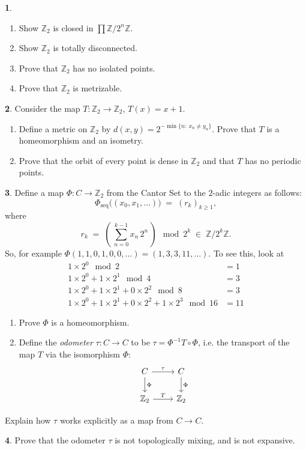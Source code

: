 \documentclass[11pt]{article}
\theoremstyle{definition}
\newtheorem{problem}{}
\newcommand{\bp}{\begin{problem}}
\newcommand{\ep}{\end{problem}\bigskip}
\theoremstyle{theorem}
\newcommand{\Z}{\mathbb{Z}}%
\begin{document}
\bp 
\begin{enumerate}[label=(\alph*)]
\item Show $\Z_2$ is closed in $\prod \Z/2^n\Z$.
\item Show $\Z_2$ is totally disconnected.
\item Prove that $\Z_2$ has no isolated points.
\item Prove that $\Z_2$ is metrizable. 
\end{enumerate}
\ep

\bp Consider the map $T:\Z_2\to\Z_2$, $T(x)=x+1$.
\begin{enumerate}[label=(\alph*)]
\item Define a metric on $\Z_2$ by $d(x,y)=2^{-\min\{n:\ x_n\ne y_n\}}$.  Prove that $T$ is a homeomorphism and an isometry.
\item Prove that the orbit of every point is dense in $\Z_2$ and that $T$ has no periodic points.
\end{enumerate}
\ep


\bp Define a map $\Phi:C\to \Z_2$ from the Cantor Set to the $2$-adic integers as follows: \[\Phi_{\mathrm{seq}}\big((x_0,x_1,\ldots)\big) \;=\; (r_k)_{k\ge1},
\]
where
\[
r_k \;=\; \left(\,\sum_{n=0}^{k-1} x_n\,2^n\,\right) \mod {2^k} \;\in\; \Z/2^k\Z.
\]
So, for example $\Phi(1,1,0,1,0,0,\ldots) = (1, 3, 3, 11, \ldots )$.  To see this, look at 
\begin{align*}
1\times2^0 \mod 2 &= 1\\
1\times2^0+1\times2^1\mod 4&=3\\
1\times2^0+1\times2^1+0\times2^2\mod 8 &=3\\
1\times2^0+1\times2^1+0\times2^2+1\times 2^3\mod 16 &= 11
\end{align*}
\begin{enumerate}[label=(\alph*)]
\item Prove $\Phi$ is a homeomorphism.
\item Define the \emph{odometer} $\tau:C\to C$ to be $\tau=\Phi^{-1}T\circ \Phi$, i.e. the transport of the map $T$ via the isomorphism $\Phi$: 
\[
\begin{tikzcd}
C \arrow[r, "\tau"] \arrow[d, "\Phi"] & C \arrow[d, "\Phi"] \\
\Z_2 \arrow[r, "T"] & \Z_2
\end{tikzcd}
\]
\end{enumerate}
Explain how $\tau$ works explicitly as a map from $C\to C$.
\ep



\bp Prove that the odometer $\tau$ is not topologically mixing, and is not expansive.
\ep
\end{document}
